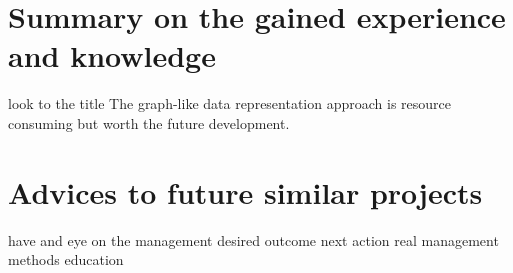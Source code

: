 \section{Summary on the gained experience and knowledge}
look to the title
The graph-like data representation approach is resource consuming but worth the future development.
\section{Advices to future similar projects}
have and eye on the management
desired outcome next action
real management methods education